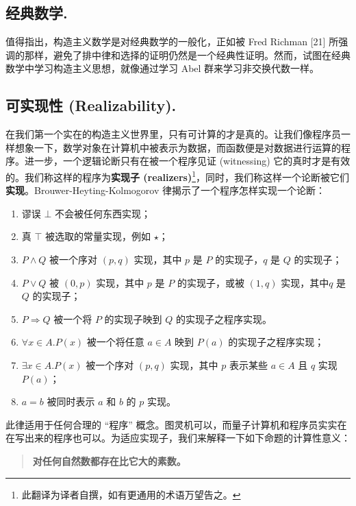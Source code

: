 \documentclass{ctexart}
\begin{document}
    \subsection{经典数学.}
      值得指出，构造主义数学是对经典数学的一般化，正如被 Fred Richman [21] 所强调的那样，避免了排中律和选择的证明仍然是一个经典性证明。然而，试图在经典数学中学习构造主义思想，就像通过学习 Abel 群来学习非交换代数一样。

    \subsection{可实现性 (Realizability).}
      在我们第一个实在的构造主义世界里，只有可计算的才是真的。让我们像程序员一样想象一下，数学对象在计算机中被表示为数据，而函数便是对数据进行运算的程序。进一步，一个逻辑论断只有在被一个程序见证 (witnessing) 它的真时才是有效的。我们称这样的程序为\textbf{实现子 (realizers)}\footnote{此翻译为译者自撰，如有更通用的术语万望告之。}，同时，我们称这样一个论断被它们\textbf{实现}。Brouwer-Heyting-Kolmogorov 律揭示了一个程序怎样实现一个论断：
      
      \begin{enumerate}
          \item 谬误 \(\bot\) 不会被任何东西实现；
          \item 真 \(\top \) 被选取的常量实现，例如 \(\star\)；
          \item \(P \land Q\) 被一个序对 \((p,q)\) 实现，其中 \(p\) 是 \(P\) 的实现子，\(q\) 是 \(Q\) 的实现子；
          \item \(P \lor Q\) 被 \((0, p)\) 实现，其中 \(p\) 是 \(P\) 的实现子，或被 \((1, q)\) 实现，其中\(q\) 是 \(Q\) 的实现子；
          \item \(P\Rightarrow Q\) 被一个将 \(P\) 的实现子映到 \(Q\) 的实现子之程序实现。
          \item \(\forall x \in A. P(x)\) 被一个将任意 \(a\in A\) 映到 \(P(a)\) 的实现子之程序实现；
          \item \(\exists x \in A. P(x)\) 被一个序对 \((p, q)\) 实现，其中 \(p\) 表示某些 \(a \in A\) 且 \(q\) 实现 \(P(a)\)；
          \item \(a=b\) 被同时表示 \(a\) 和 \(b\) 的 \(p\) 实现。
      \end{enumerate}

      此律适用于任何合理的 “程序” 概念。图灵机可以，而量子计算机和程序员实实在在写出来的程序也可以。为适应实现子，我们来解释一下如下命题的计算性意义：

      \begin{quote}
          \textbf{对任何自然数都存在比它大的素数。}
      \end{quote}
\end{document}
